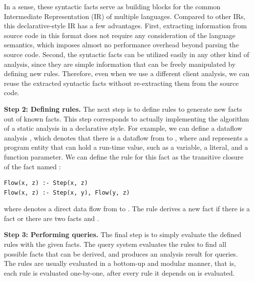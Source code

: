 In a sense, these syntactic facts serve as building blocks for the
common Intermediate Representation (IR) of multiple languages.
Compared to other IRs, this declarative-style IR has a few advantages.
First, extracting information from source code in this format does not
require any consideration of the language semantics, which imposes
almost no performance overhead beyond parsing the source code.
Second, the syntactic facts can be utilized easily in any other kind of
analysis, since they are simple information that can be freely
manipulated by defining new rules. Therefore, even when we use a different
client analysis, we can reuse the extracted syntactic facts
without re-extracting them from the source code.

\textbf{Step 2: Defining rules.}
The next step is to define rules to generate new facts out of known facts.
This step corresponds to actually implementing the algorithm of a static
analysis in a declarative style.  For example, we can define a dataflow
analysis ,  which denotes that there is a dataflow from 
to , where  and  represents a program entity that can hold
a run-time value, such as a variable, a literal, and a function parameter.  We
can define the rule for this fact as the transitive closure of the fact named
:

\begin{lstlisting}[style=mrule]
Flow(x, z) :- Step(x, z)
Flow(x, z) :- Step(x, y), Flow(y, z)
\end{lstlisting}

\noindent
where  denotes a direct data flow from  to . The
rule derives a new fact  if there is a fact  or
there are two facts  and .


\textbf{Step 3: Performing queries.}
The final step is to simply evaluate the defined rules with the given facts.
The query system evaluates the rules to find all possible facts that can be
derived, and produces an analysis result for queries. The rules are usually
evaluated in a bottom-up and modular manner, that is, each rule is evaluated
one-by-one, after every rule it depends on is evaluated.

